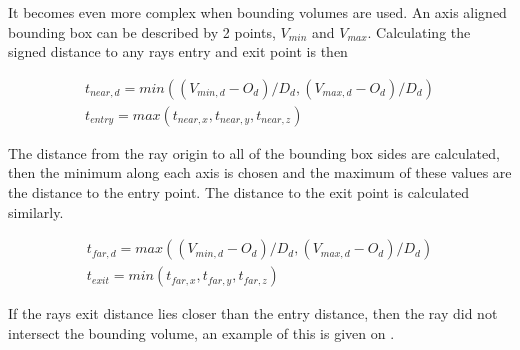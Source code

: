 It becomes even more complex when bounding volumes are used. An axis
aligned bounding box can be described by 2 points, $V_{min}$ and
$V_{max}$. Calculating the signed distance to any rays entry and exit
point is then

\begin{displaymath}
  \begin{array}{l}
    t_{near,d} = min((V_{min,d} - O_d) / D_d, (V_{max,d} - O_d) / D_d)\\
    t_{entry} = max(t_{near,x}, t_{near,y}, t_{near,z})
  \end{array}
\end{displaymath}

The distance from the ray origin to all of the bounding box sides are
calculated, then the minimum along each axis is chosen and the maximum
of these values are the distance to the entry point. The distance to
the exit point is calculated similarly.

\begin{displaymath}
  \begin{array}{l}
    t_{far,d} = max((V_{min,d} - O_d) / D_d, (V_{max,d} - O_d) / D_d)\\
    t_{exit} = min(t_{far,x}, t_{far,y}, t_{far,z})
  \end{array}
\end{displaymath}


If the rays exit distance lies closer than the entry distance, then
the ray did not intersect the bounding volume, an example of this is
given on .

